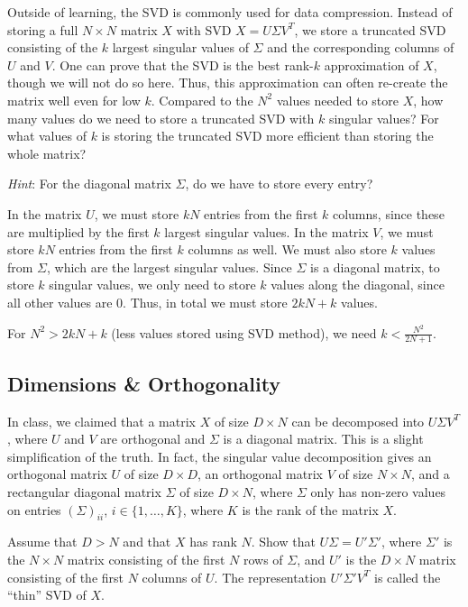 \newpage

\problem[3] Outside of learning, the SVD is commonly used for data compression. Instead of storing a full $N \times N$ matrix $X$ with SVD $X = U\Sigma V^T$, we store a truncated SVD consisting of the $k$ largest singular values of $\Sigma$ and the corresponding columns of $U$ and $V$. One can prove that the SVD is the best rank-$k$ approximation of $X$, though we will not do so here. Thus, this approximation can often re-create the matrix well even for low $k$. Compared to the $N^2$ values needed to store $X$, how many values do we need to store a truncated SVD with $k$ singular values? For what values of $k$ is storing the truncated SVD more efficient than storing the whole matrix?

\textit{Hint}: For the diagonal matrix $\Sigma$, do we have to store every entry?

\begin{solution}
    In the matrix $U$, we must store $k N$ entries from the first $k$ columns, since these are multiplied by the first $k$ largest singular values. In the matrix $V$, we must store $k N$ entries from the first $k$ columns as well. We must also store $k$ values from $\Sigma$, which are the largest singular values. Since $\Sigma$ is a diagonal matrix, to store $k$ singular values, we only need to store $k$ values along the diagonal, since all other values are 0. Thus, in total we must store $2 k N + k$ values.

    For $N^2 > 2k N + k$ (less values stored using SVD method), we need $k < \frac{N^2}{2N + 1}$.
\end{solution}

\newpage

\subsection{Dimensions \& Orthogonality} In class, we claimed that a matrix $X$ of size $D \times N$ can be decomposed into $U\Sigma V^T$, where $U$ and $V$ are orthogonal and $\Sigma$ is a diagonal matrix. This is a slight simplification of the truth. In fact, the singular value decomposition gives an orthogonal matrix $U$ of size $D \times D$, an orthogonal matrix $V$ of size $N \times N$, and a rectangular diagonal matrix $\Sigma$ of size $D \times N$, where $\Sigma$ only has non-zero values on entries $(\Sigma)_{ii}$, $i \in \{1, \ldots, K\}$, where $K$ is the rank of the matrix $X$. 

\problem[3] Assume that $D > N$ and that $X$ has rank $N$. Show that $U\Sigma = U'\Sigma'$, where $\Sigma'$ is the $N \times N$ matrix consisting of the first $N$ rows of $\Sigma$, and $U'$ is the $D \times N$ matrix consisting of the first $N$ columns of $U$. The representation $U'\Sigma' V^T$ is called the ``thin'' SVD of $X$.

